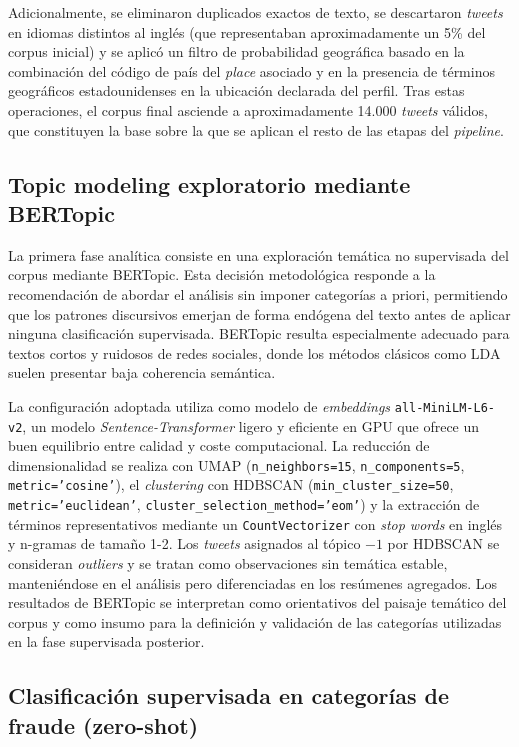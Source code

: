 Adicionalmente, se eliminaron duplicados exactos de texto, se descartaron \textit{tweets} en idiomas distintos al inglés (que representaban aproximadamente un 5\% del corpus inicial) y se aplicó un filtro de probabilidad geográfica basado en la combinación del código de país del \textit{place} asociado y en la presencia de términos geográficos estadounidenses en la ubicación declarada del perfil. Tras estas operaciones, el corpus final asciende a aproximadamente 14.000 \textit{tweets} válidos, que constituyen la base sobre la que se aplican el resto de las etapas del \textit{pipeline}.

\subsection{Topic modeling exploratorio mediante BERTopic}

La primera fase analítica consiste en una exploración temática no supervisada del corpus mediante BERTopic. Esta decisión metodológica responde a la recomendación de abordar el análisis sin imponer categorías a priori, permitiendo que los patrones discursivos emerjan de forma endógena del texto antes de aplicar ninguna clasificación supervisada. BERTopic resulta especialmente adecuado para textos cortos y ruidosos de redes sociales, donde los métodos clásicos como LDA suelen presentar baja coherencia semántica.

La configuración adoptada utiliza como modelo de \textit{embeddings} \texttt{all-MiniLM-L6-v2}, un modelo \textit{Sentence-Transformer} ligero y eficiente en GPU que ofrece un buen equilibrio entre calidad y coste computacional. La reducción de dimensionalidad se realiza con UMAP (\texttt{n\_neighbors=15}, \texttt{n\_components=5}, \texttt{metric='cosine'}), el \textit{clustering} con HDBSCAN (\texttt{min\_cluster\_size=50}, \texttt{metric='euclidean'}, \texttt{cluster\_selection\_method='eom'}) y la extracción de términos representativos mediante un \texttt{CountVectorizer} con \textit{stop words} en inglés y n-gramas de tamaño 1-2. Los \textit{tweets} asignados al tópico $-1$ por HDBSCAN se consideran \textit{outliers} y se tratan como observaciones sin temática estable, manteniéndose en el análisis pero diferenciadas en los resúmenes agregados. Los resultados de BERTopic se interpretan como orientativos del paisaje temático del corpus y como insumo para la definición y validación de las categorías utilizadas en la fase supervisada posterior.

\subsection{Clasificación supervisada en categorías de fraude (zero-shot)}

